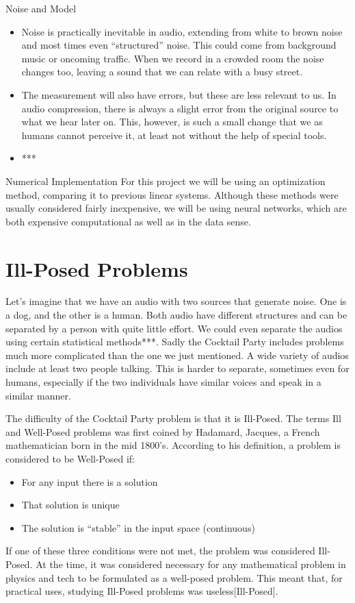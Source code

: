 \documentclass{book}
\begin{document}
\begin{center}
    \noindent Noise and Model
\end{center}
\begin{itemize}
    \item Noise is practically inevitable in audio, extending from white to brown noise and most times even “structured” noise. This could come from background music or oncoming traffic. When we record in a crowded room the noise changes too, leaving a sound that we can relate with a busy street.

    \item The measurement will also have errors, but these are less relevant to us. In audio compression, there is always a slight error from the original source to what we hear later on. This, however, is such a small change that we as humans cannot perceive it, at least not without the help of special tools.

    \item ***
\end{itemize}
    
Numerical Implementation
    For this project we will be using an optimization method, comparing it to previous linear systems. Although these methods were usually considered fairly inexpensive, we will be using neural networks, which are both expensive computational as well as in the data sense. 


\section{Ill-Posed Problems}
\qquad Let's imagine that we have an audio with two sources that generate noise. One is a dog, and the other is a human. Both audio have different structures and can be separated by a person with quite little effort. We could even separate the audios using certain statistical methods***. Sadly the Cocktail Party includes problems much more complicated than the one we just mentioned. A wide variety of audios include at least two people talking. This is harder to separate, sometimes even for humans, especially if the two individuals have similar voices and speak in a similar manner.
\par
    The difficulty of the Cocktail Party problem is that it is Ill-Posed. The terms Ill and Well-Posed problems was first coined by Hadamard, Jacques, a French mathematician born in the mid 1800’s. According to his definition, a problem is considered to be Well-Posed if: 
\begin{itemize}
    \item For any input there is a solution
    \item That solution is unique
    \item The solution is “stable” in the input space (continuous)
\end{itemize}
    If one of these three conditions were not met, the problem was considered Ill-Posed. At the time, it was considered necessary for any mathematical problem in physics and tech to be formulated as a well-posed problem. This meant that, for practical uses, studying Ill-Posed problems was useless[Ill-Posed].
\end{document}
